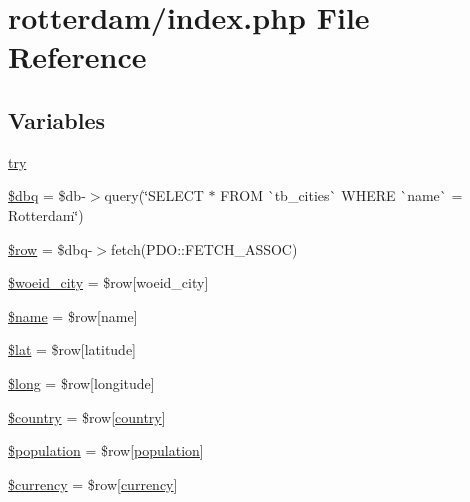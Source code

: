 \hypertarget{rotterdam_2index_8php}{}\section{rotterdam/index.php File Reference}
\label{rotterdam_2index_8php}
\subsection*{Variables}
\begin{DoxyCompactItemize}
\item 
\mbox{\hyperlink{rotterdam_2index_8php_abe4cc9788f52e49485473dc699537388}{try}}
\item 
\mbox{\hyperlink{rotterdam_2index_8php_ab76933014035168a37e7e525ca8fbabe}{\$dbq}} = \$db-\/$>$query(\char`\"{}S\+E\+L\+E\+CT $\ast$ F\+R\+OM \`{}tb\+\_\+cities\`{} W\+H\+E\+RE \`{}name\`{} = \textquotesingle{}Rotterdam\textquotesingle{}\char`\"{})
\item 
\mbox{\hyperlink{rotterdam_2index_8php_aa1d731aa570613e5bcff831bb10e9b87}{\$row}} = \$dbq-\/$>$fetch(P\+D\+O\+::\+F\+E\+T\+C\+H\+\_\+\+A\+S\+S\+OC)
\item 
\mbox{\hyperlink{rotterdam_2index_8php_a34dc977e0c4838f8c2d423849ad9ff02}{\$woeid\+\_\+city}} = \$row\mbox{[}\textquotesingle{}woeid\+\_\+city\textquotesingle{}\mbox{]}
\item 
\mbox{\hyperlink{rotterdam_2index_8php_ab2fc40d43824ea3e1ce5d86dee0d763b}{\$name}} = \$row\mbox{[}\textquotesingle{}name\textquotesingle{}\mbox{]}
\item 
\mbox{\hyperlink{rotterdam_2index_8php_af498b42b83afed4dfe0af05fd802776c}{\$lat}} = \$row\mbox{[}\textquotesingle{}latitude\textquotesingle{}\mbox{]}
\item 
\mbox{\hyperlink{rotterdam_2index_8php_a30223182013e2964ccbd7c134b3c52c1}{\$long}} = \$row\mbox{[}\textquotesingle{}longitude\textquotesingle{}\mbox{]}
\item 
\mbox{\hyperlink{rotterdam_2index_8php_a1437a5f6eb157f0eb267a26e0ad4f1ba}{\$country}} = \$row\mbox{[}\textquotesingle{}\mbox{\hyperlink{index_8php_a0f0752705301c982dc8994ebc993e6e9}{country}}\textquotesingle{}\mbox{]}
\item 
\mbox{\hyperlink{rotterdam_2index_8php_afc1939ed7d0e8629546e2bc27b02dbc1}{\$population}} = \$row\mbox{[}\textquotesingle{}\mbox{\hyperlink{index_8php_aa78fa356925cd3f67d485c4d6846202b}{population}}\textquotesingle{}\mbox{]}
\item 
\mbox{\hyperlink{rotterdam_2index_8php_a37d22fd3b896e9d5488f3479a4d8f451}{\$currency}} = \$row\mbox{[}\textquotesingle{}\mbox{\hyperlink{index_8php_abd84e0698c321abdbf211d5b8425d0b5}{currency}}\textquotesingle{}\mbox{]}

\end{DoxyCompactItemize}
